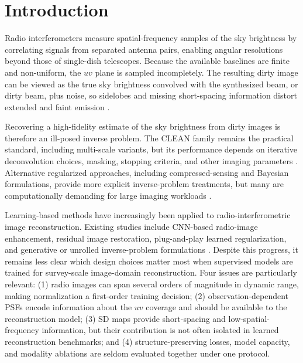 \documentclass[twocolumn]{aastex631}
\begin{document}

\section{Introduction}
\label{sec:intro}

Radio interferometers measure spatial-frequency samples of the sky brightness by correlating signals from separated antenna pairs, enabling angular resolutions beyond those of single-dish telescopes.
Because the available baselines are finite and non-uniform, the $uv$ plane is sampled incompletely.
The resulting dirty image can be viewed as the true sky brightness convolved with the synthesized beam, or dirty beam, plus noise, so sidelobes and missing short-spacing information distort extended and faint emission \citep{Thompson2017}.

Recovering a high-fidelity estimate of the sky brightness from dirty images is therefore an ill-posed inverse problem.
The CLEAN family remains the practical standard, including multi-scale variants, but its performance depends on iterative deconvolution choices, masking, stopping criteria, and other imaging parameters \citep{Hogbom1974,Cornwell2008}.
Alternative regularized approaches, including compressed-sensing and Bayesian formulations, provide more explicit inverse-problem treatments, but many are computationally demanding for large imaging workloads \citep{Wiaux2009,Li2011,Carrillo2012,Junklewitz2016,Arras2019}.

Learning-based methods have increasingly been applied to radio-interferometric image reconstruction.
Existing studies include CNN-based radio-image enhancement, residual image restoration, plug-and-play learned regularization, and generative or unrolled inverse-problem formulations \citep{Gheller2018,Schmidt2022,Connor2022,Terris2022,Aghabiglou2024,Wang2023VICDDPM,Geyer2023}.
Despite this progress, it remains less clear which design choices matter most when supervised models are trained for survey-scale image-domain reconstruction.
Four issues are particularly relevant:
(1) radio images can span several orders of magnitude in dynamic range, making normalization a first-order training decision;
(2) observation-dependent PSFs encode information about the $uv$ coverage and should be available to the reconstruction model;
(3) SD maps provide short-spacing and low-spatial-frequency information, but their contribution is not often isolated in learned reconstruction benchmarks;
and (4) structure-preserving losses, model capacity, and modality ablations are seldom evaluated together under one protocol.
\end{document}
